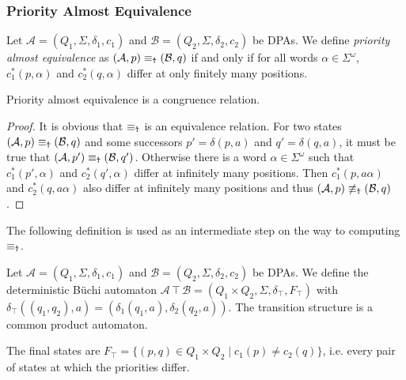 \vspace{5pt}

\subsubsection{Priority Almost Equivalence}

\begin{defn}
	Let $\mathcal{A} = (Q_1, \Sigma, \delta_1, c_1)$ and $\mathcal{B} = (Q_2, \Sigma, \delta_2, c_2)$ be DPAs. We define \emph{priority almost equivalence} as $(\mathcal{A}, p) \equiv_\text{\Ankh} (\mathcal{B}, q)$ if and only if for all words $\alpha \in \Sigma^\omega$, $c_1^*(p, \alpha)$ and $c_2^*(q, \alpha)$ differ at only finitely many positions.
\end{defn}

\begin{lem}
	Priority almost equivalence is a congruence relation.
	\label{lem:general:Ankh_congruence}
\end{lem}

\begin{proof} 
	It is obvious that $\equiv_\text{\Ankh}$ is an equivalence relation. For two states $(\mathcal{A}, p) \equiv_\text{\Ankh} (\mathcal{B}, q)$ and some successors $p' = \delta(p, a)$ and $q' = \delta(q, a)$, it must be true that $(\mathcal{A}, p') \equiv_\text{\Ankh} (\mathcal{B}, q')$. Otherwise there is a word $\alpha \in \Sigma^\omega$ such that $c_1^*(p', \alpha)$ and $c_2^*(q', \alpha)$ differ at infinitely many positions. Then $c_1^*(p, a \alpha)$ and $c_2^*(q, a \alpha)$ also differ at infinitely many positions and thus $(\mathcal{A}, p) \not\equiv_\text{\Ankh} (\mathcal{B}, q)$.
\end{proof}

The following definition is used as an intermediate step on the way to computing $\equiv_\text{\Ankh}$.

\begin{defn}
	Let $\mathcal{A} = (Q_1, \Sigma, \delta_1, c_1)$ and $\mathcal{B} = (Q_2, \Sigma, \delta_2, c_2)$ be DPAs. We define the deterministic Büchi automaton $\mathcal{A} \intercal \mathcal{B} = (Q_1 \times Q_2, \Sigma, \delta_\intercal, F_\intercal)$ with $\delta_\intercal((q_1, q_2), a) = (\delta_1(q_1, a), \delta_2(q_2, a))$. The transition structure is a common product automaton.
	
	The final states are $F_\intercal = \{ (p, q) \in Q_1 \times Q_2 \mid c_1(p) \neq c_2(q) \}$, i.e. every pair of states at which the priorities differ. 
\end{defn}

